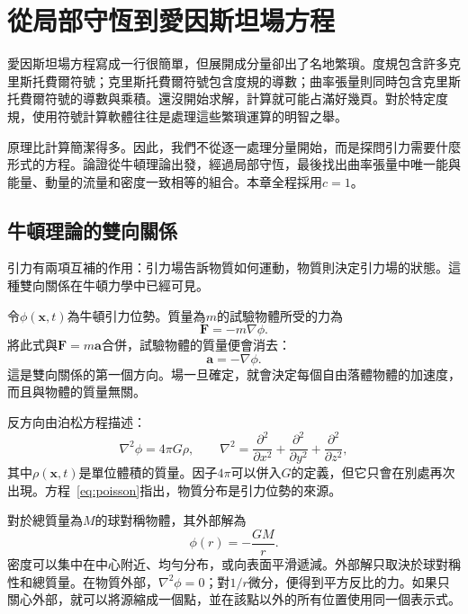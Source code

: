 \chapter{從局部守恆到愛因斯坦場方程}

愛因斯坦場方程寫成一行很簡單，但展開成分量卻出了名地繁瑣。度規包含許多克里斯托費爾符號；克里斯托費爾符號包含度規的導數；曲率張量則同時包含克里斯托費爾符號的導數與乘積。還沒開始求解，計算就可能占滿好幾頁。對於特定度規，使用符號計算軟體往往是處理這些繁瑣運算的明智之舉。

原理比計算簡潔得多。因此，我們不從逐一處理分量開始，而是探問引力需要什麼形式的方程。論證從牛頓理論出發，經過局部守恆，最後找出曲率張量中唯一能與能量、動量的流量和密度一致相等的組合。本章全程採用\(c=1\)。

\section{牛頓理論的雙向關係}

引力有兩項互補的作用：引力場告訴物質如何運動，物質則決定引力場的狀態。這種雙向關係在牛頓力學中已經可見。

令\(\phi(\mathbf{x},t)\)為牛頓引力位勢。質量為\(m\)的試驗物體所受的力為
\begin{equation}
 \mathbf{F}=-m\nabla\phi.
\end{equation}
將此式與\(\mathbf{F}=m\mathbf{a}\)合併，試驗物體的質量便會消去：
\begin{equation}
 \mathbf{a}=-\nabla\phi.
\end{equation}
這是雙向關係的第一個方向。場一旦確定，就會決定每個自由落體物體的加速度，而且與物體的質量無關。

反方向由泊松方程描述：
\begin{equation}
 \nabla^2\phi=4\pi G\rho,
 \qquad
 \nabla^2=
 \frac{\partial^2}{\partial x^2}
 +\frac{\partial^2}{\partial y^2}
 +\frac{\partial^2}{\partial z^2},
 \label{eq:poisson}
\end{equation}
其中\(\rho(\mathbf{x},t)\)是單位體積的質量。因子\(4\pi\)可以併入\(G\)的定義，但它只會在別處再次出現。方程~\eqref{eq:poisson}指出，物質分布是引力位勢的來源。

對於總質量為\(M\)的球對稱物體，其外部解為
\begin{equation}
 \phi(r)=-\frac{GM}{r}.
 \label{eq:newton-potential}
\end{equation}
密度可以集中在中心附近、均勻分布，或向表面平滑遞減。外部解只取決於球對稱性和總質量。在物質外部，\(\nabla^2\phi=0\)；對\(1/r\)微分，便得到平方反比的力。如果只關心外部，就可以將源縮成一個點，並在該點以外的所有位置使用同一個表示式。

